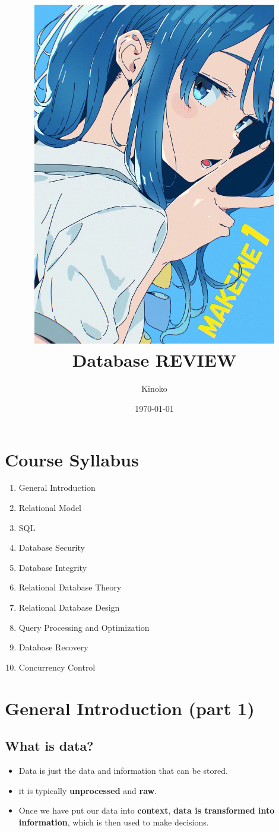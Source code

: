 \documentclass[a4paper, 12pt]{article}
\title{
    \includegraphics[width=0.8\textwidth]{Yanami_ep1.JPG}\\  %
    Database REVIEW
}
\author{Kinoko}
\date{\today}
\begin{document}

\begin{titlepage}  
    \maketitle
\end{titlepage}

\fancyhead[R]{}  %

\tableofcontents
\newpage  %


\section*{Course Syllabus}  %
    \begin{center}
        \begin{enumerate}
        \renewcommand{\labelenumi}{\Roman{enumi}.}  %
        \item General Introduction
        \item Relational Model
        \item SQL
        \item Database Security
        \item Database Integrity
        \item Relational Database Theory 
        \item Relational Database Design
        \item Query Processing and Optimization
        \item Database Recovery
        \item Concurrency Control
    \end{enumerate}
    \end{center}
    

\newpage

\setcounter{section}{0}

\section{General Introduction (part 1)}
    \subsection{What is data?}
        \begin{itemize}
            \item Data is just the data and information that can be stored.
            \item it is typically \textbf{unprocessed} and \textbf{raw}.
            \item Once we have put our data into \textbf{context}, \textbf{data is transformed into information}, which
            is then used to make decisions.
        \end{itemize}
    
\end{document}
